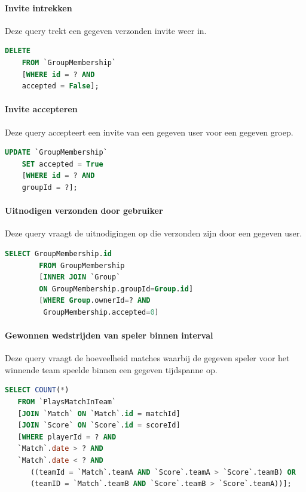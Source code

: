 \documentclass[11pt]{article}
\begin{document}
\paragraph{Invite intrekken}

  Deze query trekt een gegeven verzonden invite weer in.

  \begin{framed}
  \begin{lstlisting}[language=sql]
    DELETE 
    FROM `GroupMembership` 
    [WHERE id = ? AND 
    accepted = False];
  \end{lstlisting}
  \end{framed}
  
\paragraph{Invite accepteren}

  Deze query accepteert een invite van een gegeven user voor een gegeven groep.

  \begin{framed}
  \begin{lstlisting}[language=sql]
    UPDATE `GroupMembership`
    SET accepted = True
    [WHERE id = ? AND 
    groupId = ?];
  \end{lstlisting}
  \end{framed}  

\paragraph{Uitnodigen verzonden door gebruiker}

  Deze query vraagt de uitnodigingen op die verzonden zijn door een gegeven user.

  \begin{framed}
  \begin{lstlisting}[language=sql]
    SELECT GroupMembership.id
		FROM GroupMembership
		[INNER JOIN `Group`
		ON GroupMembership.groupId=Group.id]
		[WHERE Group.ownerId=? AND
		 GroupMembership.accepted=0]
  \end{lstlisting}
  \end{framed}


\paragraph{Gewonnen wedstrijden van speler binnen interval}

  Deze query vraagt de hoeveelheid matches waarbij de gegeven speler voor het winnende team speelde binnen een gegeven tijdspanne op.

  \begin{framed}
  \begin{lstlisting}[language=sql]
  SELECT COUNT(*)
   FROM `PlaysMatchInTeam`
   [JOIN `Match` ON `Match`.id = matchId]
   [JOIN `Score` ON `Score`.id = scoreId]
   [WHERE playerId = ? AND
   `Match`.date > ? AND
   `Match`.date < ? AND
      ((teamId = `Match`.teamA AND `Score`.teamA > `Score`.teamB) OR
      (teamID = `Match`.teamB AND `Score`.teamB > `Score`.teamA))];
  \end{lstlisting}
  \end{framed}
\end{document}
